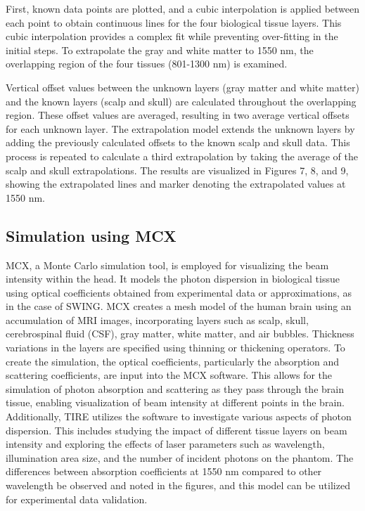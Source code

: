 \documentclass[journal,twoside,web]{ieeecolor}
\begin{document}
First, known data points are plotted, and a cubic interpolation is applied between each point to obtain continuous lines for the four biological tissue layers. 
This cubic interpolation provides a complex fit while preventing over-fitting in the initial steps. To extrapolate the gray and white matter to 1550 nm, the overlapping 
region of the four tissues (801-1300 nm) is examined.

Vertical offset values between the unknown layers (gray matter and white matter) and the known layers (scalp and skull) are calculated throughout the overlapping region. 
These offset values are averaged, resulting in two average vertical offsets for each unknown layer. The extrapolation model extends the unknown layers by adding the 
previously calculated offsets to the known scalp and skull data. This process is repeated to calculate a third extrapolation by taking the average of the scalp and skull 
extrapolations. The results are visualized in Figures 7, 8, and 9, showing the extrapolated lines and marker denoting the extrapolated values at 1550 nm.

\subsection{Simulation using MCX}
MCX, a Monte Carlo simulation tool, is employed for visualizing the beam intensity within the head. It models the photon dispersion in biological tissue using optical 
coefficients obtained from experimental data or approximations, as in the case of SWING. MCX creates a mesh model of the human brain using an accumulation of MRI images, 
incorporating layers such as scalp, skull, cerebrospinal fluid (CSF), gray matter, white matter, and air bubbles. Thickness variations in the layers are specified using thinning or thickening operators.
To create the simulation, the optical coefficients, particularly the absorption and scattering coefficients, are input into the MCX software. This allows for the simulation 
of photon absorption and scattering as they pass through the brain tissue, enabling visualization of beam intensity at different points in the brain.
Additionally, TIRE utilizes the software to investigate various aspects of photon dispersion. This includes studying the impact of different tissue layers on beam intensity 
and exploring the effects of laser parameters such as wavelength, illumination area size, and the number of incident photons on the phantom.  The differences between absorption 
coefficients at 1550 nm compared to other wavelength be observed and noted in the figures, and this model can be utilized for experimental data validation.
\end{document}
